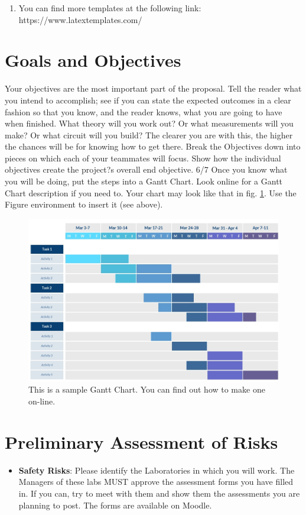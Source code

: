 \documentclass[ a4paper, 12pt, oneside ]{article} %
\begin{document}
{\begin{enumerate}
\item{ You can find more templates at the following link: \\
https://www.latextemplates.com/}
\end{enumerate}

\section{Goals and Objectives} \label{goals}
Your objectives are the most important part of the proposal. Tell the reader what you intend to accomplish; see if you can state the expected outcomes in a clear fashion so that you know, and the reader knows, what you are going to have when finished. What theory will you work out? Or what measurements will you make? Or what circuit will you build? The clearer you are with this, the higher the chances will be for knowing how to get there.
Break the Objectives down into pieces on which each of your teammates will focus. Show how the individual objectives create the project?s overall end objective.
 6/7
 Once you know what you will be doing, put the steps into a Gantt Chart. Look online for a Gantt Chart description if you need to. Your chart may look like that in fig. \ref{Fig:GanttChart}. Use the Figure environment to insert it (see above).

\begin{figure}[h] 
\centering
\includegraphics[width=\textwidth]{SampleGanttChart.png} 
\caption{This is a sample Gantt Chart. You can find out how to make one on-line.}
\label{Fig:GanttChart}
\end{figure} 
 

\section{Preliminary Assessment of Risks} 
\label{sec:RiskAssessment}
\begin{itemize}
\item{\textbf{Safety Risks}: Please identify the Laboratories in which you will work. The Managers of these labs MUST approve the assessment forms you have filled in. If you can, try to meet with them and show them the assessments you are planning to post. The forms are available on Moodle.

}
\end{itemize}}
\end{document}
